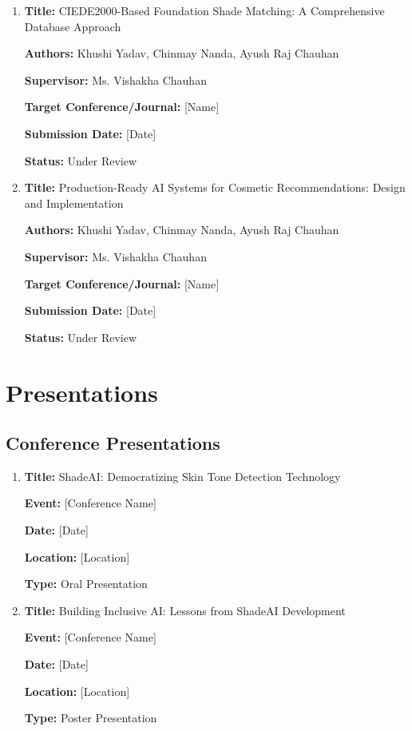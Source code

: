 \begin{enumerate}
    \item \textbf{Title:} CIEDE2000-Based Foundation Shade Matching: A Comprehensive Database Approach
    
    \textbf{Authors:} Khushi Yadav, Chinmay Nanda, Ayush Raj Chauhan
    
    \textbf{Supervisor:} Ms. Vishakha Chauhan
    
    \textbf{Target Conference/Journal:} [Name]
    
    \textbf{Submission Date:} [Date]
    
    \textbf{Status:} Under Review
    
    \vspace{0.5cm}
    
    \item \textbf{Title:} Production-Ready AI Systems for Cosmetic Recommendations: Design and Implementation
    
    \textbf{Authors:} Khushi Yadav, Chinmay Nanda, Ayush Raj Chauhan
    
    \textbf{Supervisor:} Ms. Vishakha Chauhan
    
    \textbf{Target Conference/Journal:} [Name]
    
    \textbf{Submission Date:} [Date]
    
    \textbf{Status:} Under Review
\end{enumerate}

\section{Presentations}

\subsection{Conference Presentations}

\begin{enumerate}
    \item \textbf{Title:} ShadeAI: Democratizing Skin Tone Detection Technology
    
    \textbf{Event:} [Conference Name]
    
    \textbf{Date:} [Date]
    
    \textbf{Location:} [Location]
    
    \textbf{Type:} Oral Presentation
    
    \vspace{0.5cm}
    
    \item \textbf{Title:} Building Inclusive AI: Lessons from ShadeAI Development
    
    \textbf{Event:} [Conference Name]
    
    \textbf{Date:} [Date]
    
    \textbf{Location:} [Location]
    
    \textbf{Type:} Poster Presentation
\end{enumerate}

